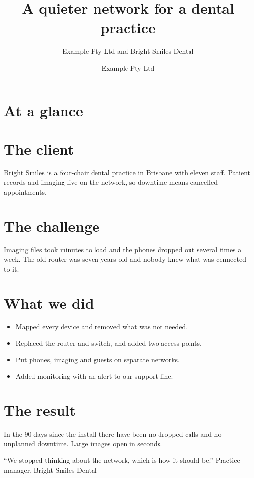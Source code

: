 \documentclass{jupiter-report}
\title{A quieter network for a dental practice}
\subtitle{Example Pty Ltd and Bright Smiles Dental}
\author{Example Pty Ltd}
\begin{document}
\maketitle
\section{At a glance}
\hfill{}\hfill{}

\section{The client}
Bright Smiles is a four-chair dental practice in Brisbane with eleven staff. Patient records and imaging live on the network, so downtime means cancelled appointments.

\section{The challenge}
Imaging files took minutes to load and the phones dropped out several times a week. The old router was seven years old and nobody knew what was connected to it.

\section{What we did}
\begin{itemize}
  \item Mapped every device and removed what was not needed.
  \item Replaced the router and switch, and added two access points.
  \item Put phones, imaging and guests on separate networks.
  \item Added monitoring with an alert to our support line.
\end{itemize}

\section{The result}
In the 90 days since the install there have been no dropped calls and no unplanned downtime. Large images open in seconds.

\begin{jpnote}[info]
``We stopped thinking about the network, which is how it should be.'' Practice manager, Bright Smiles Dental
\end{jpnote}
\end{document}
